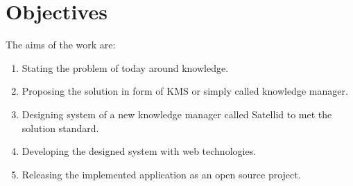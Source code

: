 \section{Objectives}
\label{sec:objectives}

The aims of the work are:

\begin{enumerate}
\item Stating the problem of today around knowledge.
\item Proposing the solution in form of \ac{KMS} or simply called knowledge manager.
\item Designing system of a new knowledge manager called Satellid to met the solution standard.
\item Developing the designed system with web technologies.
\item Releasing the implemented application as an open source project.
\end{enumerate}
